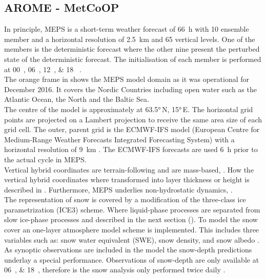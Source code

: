 \subsection{AROME - MetCoOP}
In principle, MEPS is a short-term weather forecast of \SI{66}{\hour} with 10 ensemble member and a horizontal resolution of \SI{2.5}{\km} and 65 vertical levels. One of the members is the deterministic forecast where the other nine present the perturbed state of the deterministic forecast. The initialisation of each member is performed at \SIlist{00;06;12;18}{\UTC} \citep{metcoop_wiki_description_2017}.
\\
The orange frame in  shows the MEPS model domain as it was operational for December 2016. It covers the Nordic Countries including open water such as the Atlantic Ocean, the North and the Baltic Sea.  
\\
The centre of the model is approximately at \ang{63.5}\,N, \ang{15}\,E. 
The horizontal grid points are projected on a Lambert projection to receive the same area size of each grid cell. 
The outer, parent grid is the ECMWF-IFS model (European Centre for Medium-Range Weather Forecasts Integrated Forecasting System) with a horizontal resolution of \SI{9}{\km} \citep{homleid_verification_2016}. The ECMWF-IFS forecasts are used \SI{6}{\hour} prior to the actual cycle in MEPS.
\\
Vertical hybrid coordinates are terrain-following and are mass-based, \citep{muller_arome-metcoop:_2017}. How the vertical hybrid coordinates where transformed into layer thickness or height is described in . Furthermore, MEPS underlies non-hydrostatic dynamics, \cite{metcoop_wiki_description_2017}.
\\
The representation of snow is covered by a modification of the three-class ice parametrization (ICE3) scheme. Where liquid-phase processes are separated from slow ice-phase processes and described in the next section (). To model the snow cover an one-layer atmosphere model scheme is implemented. This includes three variables such as: snow water equivalent (SWE), snow density, and snow albedo \citep{muller_arome-metcoop:_2017}.
\\
As synoptic observations are included in the model the snow-depth predictions underlay a special performance. Observations of snow-depth are only available at \SIlist{06;18}{\UTC}, therefore is the snow analysis only performed twice daily \citep{muller_arome-metcoop:_2017, homleid_verification_2016}. 
%
